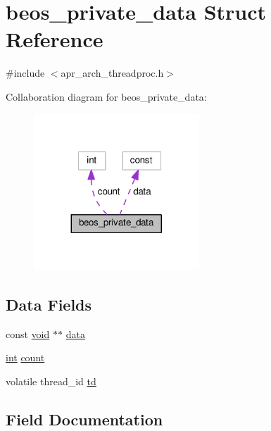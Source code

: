 \hypertarget{structbeos__private__data}{}\section{beos\+\_\+private\+\_\+data Struct Reference}
\label{structbeos__private__data}


{\ttfamily \#include $<$apr\+\_\+arch\+\_\+threadproc.\+h$>$}



Collaboration diagram for beos\+\_\+private\+\_\+data\+:
\nopagebreak
\begin{figure}[H]
\begin{center}
\leavevmode
\includegraphics[width=176pt]{structbeos__private__data__coll__graph}
\end{center}
\end{figure}
\subsection*{Data Fields}
\begin{DoxyCompactItemize}
\item 
const \hyperlink{group__MOD__ISAPI_gacd6cdbf73df3d9eed42fa493d9b621a6}{void} $\ast$$\ast$ \hyperlink{structbeos__private__data_a28f3903503049e39eb2bb7e5a0732904}{data}
\item 
\hyperlink{pcre_8txt_a42dfa4ff673c82d8efe7144098fbc198}{int} \hyperlink{structbeos__private__data_a5bafc455b7c497c0d725e003efd9bd2e}{count}
\item 
volatile thread\+\_\+id \hyperlink{structbeos__private__data_a448674605355f85613d487dc5d755423}{td}
\end{DoxyCompactItemize}


\subsection{Field Documentation}
